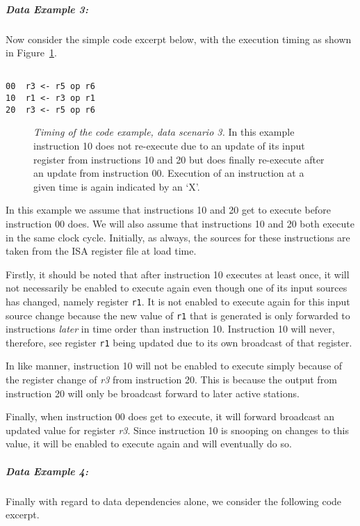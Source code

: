 \documentclass[10pt,dvips]{article}
\begin{document}
\subparagraph{Data Example 3: }
Now consider the simple code excerpt below, with the execution timing
as shown in Figure~\ref{ex3}.

\begin{verbatim}

00	r3 <- r5 op r6
10	r1 <- r3 op r1
20	r3 <- r5 op r6

\end{verbatim}

\begin{figure}
\centering
{}
\caption{{\em Timing of the code example, data scenario 3.}
In this example instruction 10 does not re-execute due to an update
of its input register from instructions 10 and 20 but does
finally re-execute after an update from instruction 00.
Execution of an instruction at a given time is
again indicated by an `X'.}
\label{ex3}
\end{figure}

In this example we assume that instructions 10 and 20 get to execute
before instruction 00 does.  We will also assume that instructions
10 and 20 both execute in the same clock cycle.
Initially, as always, the sources for these instructions
are taken from the ISA register file at load time.

Firstly, it should be noted that after instruction 10
executes at least once, it will not necessarily be enabled to execute
again even though one of its input sources has changed, namely
register
{\tt r1}.
It is not enabled to execute again for this input source change because
the new value of
{\tt r1}
that is generated is only forwarded to instructions {\it later}
in time order than instruction 10.  
Instruction 10 will never, therefore, see register
{\tt r1}
being updated due to its own broadcast of that register.

In like manner, instruction
10 will not be enabled to execute simply because of the register change
of
{\it r3}
from instruction 20.  This is because the output from instruction 20 will
only be broadcast forward to later active stations.

Finally, when instruction 00 does get to execute, it will
forward broadcast an updated value for register
{\it r3}.
Since instruction 10 is snooping on changes to this value,
it will be enabled to execute again and will eventually do so.

\subparagraph{Data Example 4: }
Finally with regard to data dependencies alone, we consider
the following code excerpt.
\end{document}
